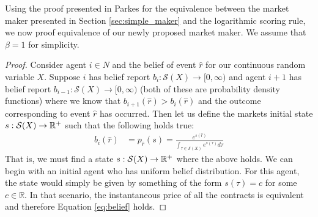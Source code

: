Using the proof presented in Parkes \cite{textbook} for the equivalence between the market maker presented in Section \ref{sec:simple_maker} and the logarithmic scoring rule, we now proof equivalence of our newly proposed market maker. We assume that $\beta = 1$ for simplicity. 
\begin{proof}
Consider agent $i \in N$ and the belief of event $\hat{r}$ for our continuous random variable $X$. Suppose $i$ has belief report $b_i: \mathcal{S}(X) \to [0,\infty)$ and agent $i+1$ has belief report $b_{i-1}: \mathcal{S}(X) \to [0,\infty)$ (both of these are probability density functions) where we know that $b_{i+1}(\hat{r}) > b_{i}(\hat{r})$ and the outcome corresponding to event $\hat{r}$ has occurred. Then let us define the markets initial state $s: \mathcal{S}(X) \to \mathbb{R}^+$ such that the following holds true:
\begin{align}
b_i(\hat{r}) &=  p_{\hat{r}}(s) = \frac{e^{s(\hat{r})}}{\int_{\tau \in \mathcal{S}(X)} e^{s(\tau)} d\tau}
\label{eq:belief}
\end{align}
That is, we must find a state $s: \mathcal{S}(X) \to \mathbb{R}^+$ where the above holds. We can begin with an initial agent who has uniform belief distribution. For this agent, the state would simply be given by something of the form $s(\tau) = c$ for some $c \in \mathbb{R}$. In that scenario, the instantaneous price of all the contracts is equivalent and therefore Equation \ref{eq:belief} holds.


\end{proof}
